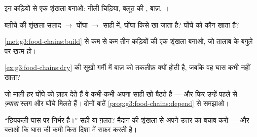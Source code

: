 \begin{exercise}[$\star$]\label{exo:g3:food-chains:5}
इन कड़ियों से एक शृंखला बनाओ: नीली चिड़िया, बलूत की , बाज़,
।
\end{exercise}

\begin{exercise}[$\star$]\label{exo:g3:food-chains:6}
बग़ीचे की शृंखला सलाद $\rightarrow$ घोंघा $\rightarrow$ साही में,
घोंघा किसे खा जाता है? घोंघे को कौन खाता है?
\end{exercise}

\begin{exercise}[$\star$]\label{exo:g3:food-chains:7}
\cref{met:g3:food-chains:build} से कम से कम तीन कड़ियों की एक शृंखला
बनाओ, जो तालाब के बगुले पर ख़त्म हो।
\end{exercise}

\begin{exercise}[$\star$]\label{exo:g3:food-chains:8}
\cref{ex:g3:food-chains:dry} की सूखी गर्मी में बाज़ को तकलीफ़ क्यों
होती है, जबकि वह घास कभी नहीं खाता?
\end{exercise}

\begin{exercise}[$\star\star$]\label{exo:g3:food-chains:9}
जो माली हर घोंघे को ज़हर देते हैं वे कभी-कभी अपना साही खो बैठते हैं ---
और फिर उन्हें पहले से \emph{ज़्यादा} स्लग और घोंघे मिलते हैं। दोनों
बातें \cref{prop:g3:food-chains:depend} से समझाओ।
\end{exercise}

\begin{exercise}[$\star\star$]\label{exo:g3:food-chains:10}
``छिपकली घास पर निर्भर है।'' सही या ग़लत? मैदान की शृंखला से अपने उत्तर
का बचाव करो --- और बताओ कि घास की कमी किस दिशा में सफ़र करती है।
\end{exercise}
